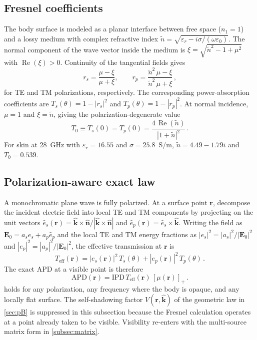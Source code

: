\documentclass[journal,twocolumn,10pt]{IEEEtran}
\theoremstyle{plain}
\theoremstyle{remark}
\newcommand{\khat}{\hat{\bm{k}}}
\newcommand{\nhat}{\hat{\bm{n}}}
\newcommand{\rr}{\mathbf{r}}
\newcommand{\EE}{\mathbf{E}}
\newcommand{\IPD}{\mathrm{IPD}}
\newcommand{\APD}{\mathrm{APD}}
\newcommand{\Teff}{T_{\mathrm{eff}}}
\newcommand{\ntilde}{\tilde{n}}
\newcommand{\pospart}[1]{\left[#1\right]_{+}}
\newcommand{\Vis}{V}
\DeclareMathOperator{\RE}{Re}
\begin{document}
\subsection{Fresnel coefficients}
The body surface is modeled as a planar interface between free
space ($n_1 = 1$) and a lossy medium with complex refractive index
$\ntilde = \sqrt{\varepsilon_r - i\sigma/(\omega\varepsilon_0)}$. The
normal component of the wave vector inside the medium is
$\xi = \sqrt{\ntilde^2 - 1 + \mu^2}$ with $\RE(\xi) > 0$. Continuity
of the tangential fields gives
\begin{equation}\label{eq:rs-rp}
  r_s = \frac{\mu - \xi}{\mu + \xi},
  \qquad
  r_p = \frac{\ntilde^2\,\mu - \xi}{\ntilde^2\,\mu + \xi}\, ,
\end{equation}
for TE and TM polarizations, respectively. The corresponding
power-absorption
coefficients are $T_s(\theta) = 1 - |r_s|^2$ and
$T_p(\theta) = 1 - |r_p|^2$. At normal incidence, $\mu = 1$ and
$\xi = \ntilde$, giving the polarization-degenerate value
\begin{equation}\label{eq:T0}
  T_0 \equiv T_s(0) = T_p(0) = \frac{4\,\RE(\ntilde)}{|1+\ntilde|^2}\, .
\end{equation}
For skin at 28~GHz with $\varepsilon_r = 16.55$ and
$\sigma = 25.8$~S/m, $\ntilde = 4.49 - 1.79i$ and $T_0 = 0.539$.

\subsection{Polarization-aware exact law}\label{subsec:exact-law}
A monochromatic plane wave is fully polarized. At a surface point
$\rr$, decompose the incident electric field into local TE and TM
components by projecting on the unit vectors
$\hat{e}_s(\rr) = \khat \times \nhat / |\khat \times \nhat|$ and
$\hat{e}_p(\rr) = \hat{e}_s \times \khat$. Writing the field as
$\EE_0 = a_s \hat{e}_s + a_p \hat{e}_p$ and the local TE and TM
energy fractions as $|e_s|^2 = |a_s|^2 / |\EE_0|^2$ and
$|e_p|^2 = |a_p|^2 / |\EE_0|^2$, the effective transmission at $\rr$
is
\begin{equation}\label{eq:Teff}
  \Teff(\rr) = |e_s(\rr)|^2 \, T_s(\theta) + |e_p(\rr)|^2 \,
  T_p(\theta)\, .
\end{equation}
The exact \gls{APD} at a visible point is therefore
\begin{equation}\label{eq:Sab-exact}
  \APD(\rr) = \IPD \, \Teff(\rr) \, \pospart{\mu(\rr)} \,.
\end{equation}
 holds for any polarization, any frequency where
the body is opaque, and any locally flat surface. The self-shadowing
factor $\Vis(\rr,\khat)$ of the geometric law in \cref{sec:pB} is
suppressed in this subsection because the Fresnel calculation
operates at a point already taken to be visible. Visibility re-enters
with the multi-source matrix form in \cref{subsec:matrix}.
\end{document}
